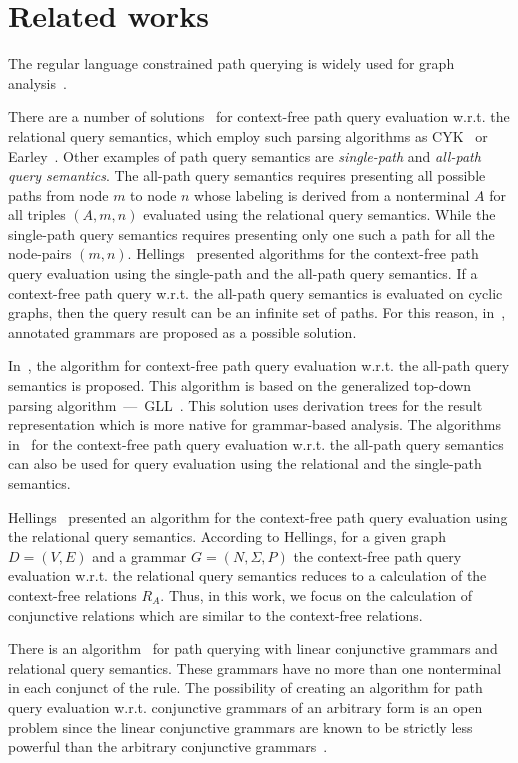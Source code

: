 \section{Related works} \label{section_related}
The regular language constrained path querying is widely used for graph analysis~\cite{abiteboul1997regular,fan2011adding,nole2016regular,reutter2017regular}.

There are a number of solutions~\cite{azimov2018context,hellingsRelational,GraphQueryWithEarley,RDF} for context-free path query evaluation w.r.t. the relational query semantics, which employ such parsing algorithms as CYK~\cite{kasami,younger} or Earley~\cite{Grune}. Other examples of path query semantics are \textit{single-path} and \textit{all-path query semantics}. The all-path query semantics requires presenting all possible paths from node $m$ to node $n$ whose labeling is derived from a nonterminal $A$ for all triples $(A, m, n)$ evaluated using the relational query semantics. While the single-path query semantics requires presenting only one such a path for all the node-pairs $(m, n)$. Hellings~\cite{hellingsPathQuerying} presented algorithms for the context-free path query evaluation using the single-path and the all-path query semantics. If a context-free path query w.r.t. the all-path query semantics is evaluated on cyclic graphs, then the query result can be an infinite set of paths. For this reason, in~\cite{hellingsPathQuerying}, annotated grammars are proposed as a possible solution.

In~\cite{GLL}, the algorithm for context-free path query evaluation w.r.t. the all-path query semantics is proposed. This algorithm is based on the generalized top-down parsing algorithm~---~GLL~\cite{scott2010gll}. This solution uses derivation trees for the result representation which is more native for grammar-based analysis. The algorithms in~\cite{GLL,hellingsPathQuerying} for the context-free path query evaluation w.r.t. the all-path query semantics can also be used for query evaluation using the relational and the single-path semantics.

Hellings~\cite{hellingsRelational} presented an algorithm for the context-free path query evaluation using the relational query semantics. According to Hellings, for a given graph $D = (V, E)$ and a grammar $G = (N, \Sigma, P)$ the context-free path query evaluation w.r.t. the relational query semantics reduces to a calculation of the context-free relations $R_A$. Thus, in this work, we focus on the calculation of conjunctive relations which are similar to the context-free relations.

There is an algorithm~\cite{zhang2017context} for path querying with linear conjunctive grammars and relational query semantics. These grammars have no more than one nonterminal in each conjunct of the rule. The possibility of creating an algorithm for path query evaluation w.r.t. conjunctive grammars of an arbitrary form is an open problem since the linear conjunctive grammars are known to be strictly less powerful than the arbitrary conjunctive grammars~\cite{okhotinConjAndBool}.